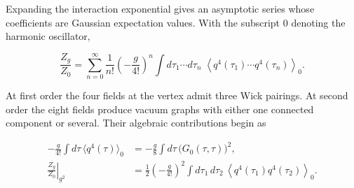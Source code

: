 Expanding the interaction exponential gives an asymptotic series whose
coefficients are Gaussian expectation values. With the subscript $0$ denoting
the harmonic oscillator,

\begin{equation}
 \frac{Z_g}{Z_0}
 =\sum_{n=0}^{\infty}\frac{1}{n!}
 \left(-\frac{g}{4!}\right)^n
 \int d\tau_1\cdots d\tau_n\;
 \left\langle q^4(\tau_1)\cdots q^4(\tau_n)\right\rangle_0.
 \label{eq:253a-quartic-expansion}
\end{equation}

At first order the four fields at the vertex admit three Wick pairings. At
second order the eight fields produce vacuum graphs with either one connected
component or several. Their algebraic contributions begin as

\begin{equation}
 \begin{aligned}
 -\frac{g}{4!}\int d\tau\,\langle q^4(\tau)\rangle_0
 &=-\frac{g}{8}\int d\tau\,\bigl(G_0(\tau,\tau)\bigr)^2,\\
 \left.\frac{Z_g}{Z_0}\right|_{g^2}
 &=\frac{1}{2}\left(-\frac{g}{4!}\right)^2
 \int d\tau_1\,d\tau_2\,
 \left\langle q^4(\tau_1)q^4(\tau_2)\right\rangle_0.
 \end{aligned}
 \label{eq:253a-first-vacuum-graphs}
\end{equation}

